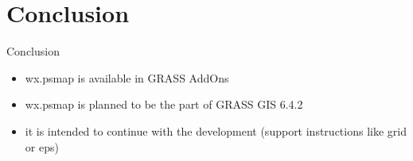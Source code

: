 \documentclass[xcolor=dvipsnames,beamer,compress]{beamer} %
\begin{document}
\section{Conclusion}
\begin{frame}[label=conclusion]{Conclusion}
\begin{block}

\begin{itemize}
\item wx.psmap is available in GRASS AddOns
\item wx.psmap is planned to be the part of  GRASS GIS 6.4.2
\item it is intended to continue with the development (support instructions like grid or eps)

\end{itemize}
\end{block}
\end{frame}
\end{document}
